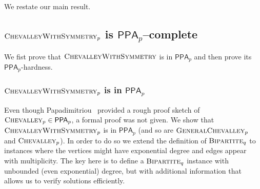 \documentclass[10pt,a4paper]{article}
\theoremstyle{definition}
\theoremstyle{remark}
\newcommand{\class}[1]{\ensuremath{\mathsf{#1}}\xspace}
\newcommand{\PPA}{\class{PPA}}
\newcommand{\PPAp}{\class{PPA}_{{p}}}
\newcommand{\pnum}{p}
\newcommand{\qnum}{q}
\newcommand{\bipartiteq}{\ensuremath{\textsc{Bipartite}_\qnum}}
\newcommand{\bipartite}{\ensuremath{\textsc{Bipartite}}}
\newcommand{\Chevalley}{\ensuremath\textsc{Chevalley}}
\newcommand{\lChevalleyp}{\textsc{GeneralChevalley}_{\pnum}}
\newcommand{\cChevalleyp}{\textsc{ChevalleyWithSymmetry}_{\pnum}}
\newcommand{\eChevalleyp}{\textsc{Chevalley}_{\pnum}}
\newcommand{\cChevalley}{\textsc{ChevalleyWithSymmetry}}
\begin{document}
\noindent We restate our main result.

\completeness*

\subsection{\boldmath $\cChevalleyp$ is $\PPAp$--complete}
\label{sec:proofOfCombinedChevalley}

  We fist prove that $\cChevalley$ is in $\PPAp$ and then
prove its $\PPAp$-hardness.


\subsubsection{\boldmath $\cChevalleyp$ is in $\PPA_p$}

Even though Papadimitriou~\cite{r33} provided a rough proof sketch of $\Chevalley_p \in \PPAp$, a formal proof was not given. We show that $\cChevalleyp$ is in $\PPAp$ (and so are $\lChevalleyp$ and $\eChevalleyp$). In order to do so we extend the definition of $\bipartiteq$ to instances where the vertices might have exponential degree and edges appear with multiplicity. The key here is to define a $\bipartite_q$ instance with unbounded (even exponential) degree, but with additional information that allows us to verify solutions efficiently.\\[-1mm]
\end{document}
